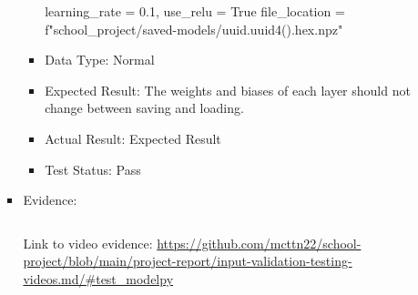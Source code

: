 \documentclass[./project-report/src/latex/project-report.tex]{subfiles}
\begin{document}
\begin{itemize}
\begin{itemize}
\begin{itemize}
\begin{itemize}
                            learning\_rate = 0.1, \newline
                            use\_relu = True
							file\_location = f"school\_project/saved-models/{uuid.uuid4().hex}.npz"
						\item Data Type: Normal
						\item Expected Result: The weights and biases of each layer should not change between saving and loading.
						\item Actual Result: Expected Result
						\item Test Status: Pass
					\end{itemize}
					\item Evidence:
						\inputminted{python}{./school_project/test/models/cpu/utils/test_model.py}

						\pagebreak

						\begin{figure}[h!]
						\centering
						\end{figure}
	
						Link to video evidence: \url{https://github.com/mcttn22/school-project/blob/main/project-report/input-validation-testing-videos.md/#test_modelpy}


\end{itemize}
\end{itemize}
\end{itemize}
\end{document}
